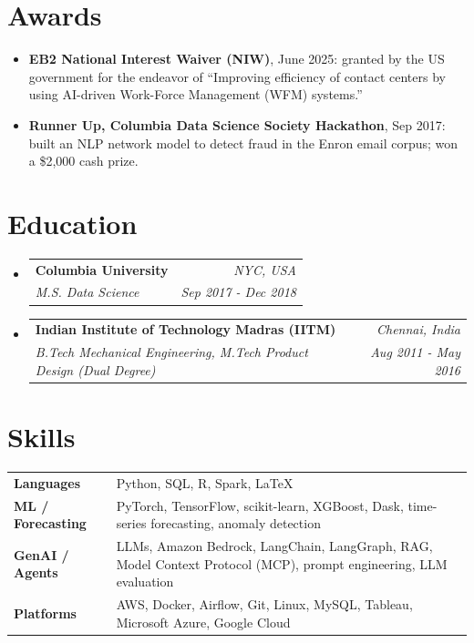 \documentclass[a4paper,20pt]{article}
\makeatletter
\newcommand{\resumeSubheading}[4]{
  \vspace{-1pt}\item
    \begin{tabular*}{0.97\textwidth}{l@{\extracolsep{\fill}}r}
      \textbf{#1} & \textit{#2} \\
      \textit{#3} & \textit{#4} \\
    \end{tabular*}\vspace{-5pt}
}
\newcommand{\resumeSubHeadingListStart}{\begin{itemize}[leftmargin=*]}
\newcommand{\resumeSubHeadingListEnd}{\end{itemize}}
\makeatother
\begin{document}
\section{Awards}
\begin{itemize}[leftmargin=*, itemsep=0pt, topsep=1pt]
  \item \textbf{EB2 National Interest Waiver (NIW)}, June 2025: granted by the US government for the endeavor of ``Improving efficiency of contact centers by using AI-driven Work-Force Management (WFM) systems.''
  \item \textbf{Runner Up, Columbia Data Science Society Hackathon}, Sep 2017: built an NLP network model to detect fraud in the Enron email corpus; won a \$2,000 cash prize.
\end{itemize}

\section{Education}
  \resumeSubHeadingListStart
    \resumeSubheading
      {Columbia University}{NYC, USA}
      {M.S. Data Science}{Sep 2017 - Dec 2018}
      \par\vspace{6pt}{\small Coursework: Probability Theory, Statistics, Machine Learning, NLP, Deep Learning, Algorithms, Data Storytelling}
    \resumeSubheading
      {Indian Institute of Technology Madras (IITM)}{Chennai, India}
      {B.Tech Mechanical Engineering, M.Tech Product Design (Dual Degree)}{Aug 2011 - May 2016}
      \par\vspace{6pt}{\small Coursework: Computational Engineering, Time Series Analysis, Regression Models, Operations Management}
  \resumeSubHeadingListEnd

\vspace{-4pt}
\section{Skills}
\begin{tabular}{@{}p{1.4in}p{}@{}}
  \textbf{Languages} & Python, SQL, R, Spark, LaTeX \\
  \textbf{ML / Forecasting} & PyTorch, TensorFlow, scikit-learn, XGBoost, Dask, time-series forecasting, anomaly detection \\
  \textbf{GenAI / Agents} & LLMs, Amazon Bedrock, LangChain, LangGraph, RAG, Model Context Protocol (MCP), prompt engineering, LLM evaluation \\
  \textbf{Platforms} & AWS, Docker, Airflow, Git, Linux, MySQL, Tableau, Microsoft Azure, Google Cloud \\
\end{tabular}
\end{document}
